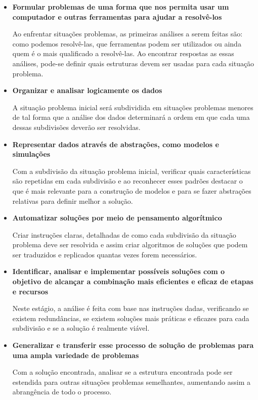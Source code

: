 \documentclass[12pt, openright, a4paper, brazil, english, french, spanish, bibjustif, openany, oneside]{abntex2}
\begin{document}
\begin{itemize}
\item \textbf{Formular problemas de uma forma que nos permita usar um computador e outras ferramentas para ajudar a resolvê-los}

Ao enfrentar situações problemas, as primeiras análises a serem feitas são: como podemos resolvê-las, que ferramentas podem ser utilizados ou ainda quem é o mais qualificado a resolvê-las. Ao encontrar respostas as essas análises, pode-se definir quais estruturas devem ser usadas para cada situação problema.

\item \textbf{Organizar e analisar logicamente os dados}

A situação problema inicial será subdividida em situações problemas menores de tal forma que a análise dos dados determinará a ordem em que cada uma dessas subdivisões deverão ser resolvidas.

\item \textbf{Representar dados através de abstrações, como modelos e simulações}

Com a subdivisão da situação problema inicial, verificar quais características são repetidas em cada subdivisão e ao reconhecer esses padrões destacar o que é mais relevante para a construção de modelos e para se fazer abstrações relativas para definir melhor a solução.

\item \textbf{Automatizar soluções por meio de pensamento algorítmico}

Criar instruções claras, detalhadas de como cada subdivisão da situação problema deve ser resolvida e assim criar algoritmos de soluções que podem ser traduzidos e replicados quantas vezes forem necessários.

\item \textbf{Identificar, analisar e implementar possíveis soluções com o objetivo de alcançar a combinação mais eficientes e eficaz de etapas e recursos}

Neste estágio, a análise é feita com base nas instruções dadas, verificando se existem redundâncias, se existem soluções mais práticas e eficazes para cada subdivisão e se a solução é realmente viável.

\item \textbf{Generalizar e transferir esse processo de solução de problemas para uma ampla variedade de problemas}

Com a solução encontrada, analisar se a estrutura encontrada pode ser estendida para outras situações problemas semelhantes, aumentando assim a abrangência de todo o processo.

\end{itemize}
\end{document}
